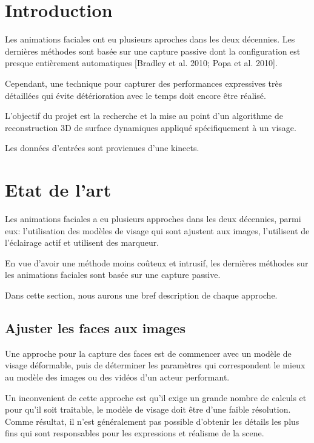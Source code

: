 \documentclass[a4paper,11pt]{article}
\begin{document}
\newpage
\thispagestyle{empty}
\tableofcontents
\newpage
\setcounter{page}{1}

\section{Introduction}

Les animations faciales ont eu plusieurs aproches dans les deux décennies. Les dernières méthodes sont basée sur une capture passive dont la configuration est presque entièrement automatiques [Bradley et al. 2010; Popa et al. 2010]. 

Cependant, une technique pour capturer des performances expressives très détaillées qui évite détérioration avec le temps doit encore être réalisé.

L'objectif du projet est la recherche et la mise au point d'un algorithme de reconstruction 3D de surface dynamiques appliqué spécifiquement à un visage. 

Les données d'entrées sont provienues d'une kinects.

\section{Etat de l'art}

Les animations faciales a eu plusieurs approches dans les deux décennies, 
parmi eux: l'utilisation des modèles de visage qui sont ajustent aux images, 
l'utilisent de l'éclairage actif et utilisent des marqueur.

En vue d'avoir une méthode moins coûteux et intrusif, les dernières méthodes sur les animations faciales sont basée sur une capture passive.


Dans cette section, nous aurons une bref description de chaque approche.

\subsection{Ajuster les faces aux images}
Une approche pour la capture des faces est de commencer avec un modèle de visage déformable, puis de déterminer les paramètres qui correspondent le mieux au modèle des images ou des vidéos d'un acteur performant.

Un inconvenient de cette approche est qu'il exige un grande nombre de calculs et pour qu'il soit traitable, le modèle de visage doit être d'une faible résolution.
Comme résultat, il n'est généralement pas possible d'obtenir les détails les plus fins qui sont responsables pour les expressions et réalisme de la scene.
\end{document}
